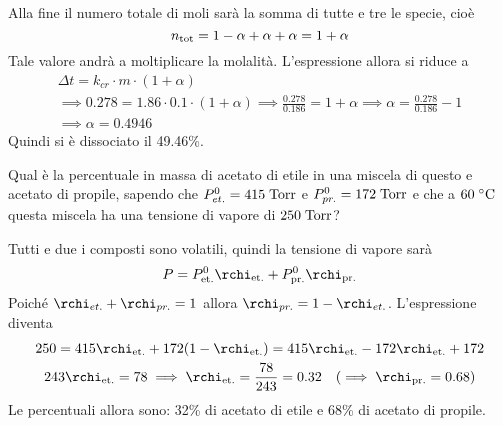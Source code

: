 \begin{soluzione}
    Alla fine il numero totale di moli sarà la somma di tutte e tre le specie, cioè
    \begin{equation*}
        n_{\rm tot}
        =1 - \alpha + \alpha + \alpha
        =1+\alpha
    \end{equation*}
    Tale valore andrà a moltiplicare la molalità. L'espressione allora si riduce a
    \begin{gather*}
        \Delta t
        =k_{cr} \cdot m \cdot (1 + \alpha)
        \\
        \implies
        0.278 = 1.86 \cdot 0.1 \cdot (1+\alpha)
        \implies
        \frac{0.278}{0.186}= 1 + \alpha
        \implies
        \alpha=\frac{0.278}{0.186} - 1
        \\
        \implies \alpha=0.4946
    \end{gather*}
    Quindi si è dissociato il 49.46\%.
\end{soluzione}

\newpage

\begin{esercizio}
    Qual è la percentuale in massa di acetato di etile in una miscela di questo e acetato di propile, sapendo che $P_{et.}^0=415 \; \rm Torr$ e $P_{pr.}^0=172 \; \rm Torr$ e che a $60 \; ^{\circ} \rm C$ questa miscela ha una tensione di vapore di $250 \; \rm Torr$?
\end{esercizio}
\begin{soluzione}
    Tutti e due i composti sono volatili, quindi la tensione di vapore sarà
    \begin{equation*}
        P=P_{\rm et.}^0 \rchi_{\rm et.} + P_{\rm pr.}^0 \rchi_{\rm pr.}
    \end{equation*}
    Poiché $\rchi_{et.} + \rchi_{pr.}=1$ allora $\rchi_{pr.}=1 - \rchi_{et.}$. L'espressione diventa
    \begin{gather*}
        250
        =415 \rchi_{\rm et.} + 172(1 - \rchi_{\rm et.})
        =415 \rchi_{\rm et.} - 172 \rchi_{\rm et.} + 172
        \\
        243\rchi_{\rm et.}=78
        \implies
        \rchi_{\rm et.}=\frac{78}{243}
        =0.32
        \quad
        (\implies \rchi_{\rm pr.}=0.68)
    \end{gather*}
    Le percentuali allora sono: 32\% di acetato di etile e 68\% di acetato di propile.
\end{soluzione}

\newpage

